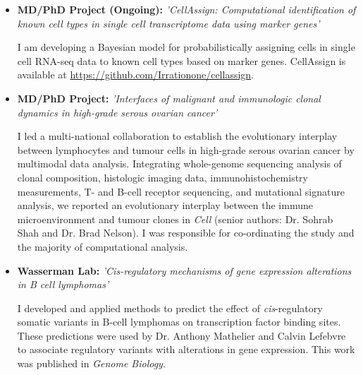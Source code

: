 \documentclass[11pt,a4paper,sans]{moderncv}        %
\begin{document}
\begin{itemize}

\item{\textbf{MD/PhD Project (Ongoing):} \textit{'CellAssign: Computational identification of known cell types in single cell transcriptome data using marker genes'}

\vspace{3pt}

\small{I am developing a Bayesian model for probabilistically assigning cells in single cell RNA-seq data to known cell types based on marker genes. CellAssign is available at \url{https://github.com/Irrationone/cellassign}.}}

\vspace{6pt}

\item{\textbf{MD/PhD Project:} \textit{'Interfaces of malignant and immunologic clonal dynamics in high-grade serous ovarian cancer'}

\vspace{3pt}

\small{I led a multi-national collaboration to establish the evolutionary interplay between lymphocytes and tumour cells in high-grade serous ovarian cancer by multimodal data analysis. Integrating whole-genome sequencing analysis of clonal composition, histologic imaging data, immunohistochemistry measurements, T- and B-cell receptor sequencing, and mutational signature analysis, we reported an evolutionary interplay between the immune microenvironment and tumour clones in \emph{Cell} (senior authors: Dr. Sohrab Shah and Dr. Brad Nelson). I was responsible for co-ordinating the study and the majority of computational analysis.}}

\vspace{6pt}

\item{\textbf{Wasserman Lab:} \textit{'Cis-regulatory mechanisms of gene expression alterations in B cell lymphomas'}

\vspace{3pt}

\small{I developed and applied methods to predict the effect of \emph{cis}-regulatory somatic variants in B-cell lymphomas on transcription factor binding sites. These predictions were used by Dr. Anthony Mathelier and Calvin Lefebvre to associate regulatory variants with alterations in gene expression. This work was published in \emph{Genome Biology}.}}

\vspace{6pt}


\end{itemize}
\end{document}
